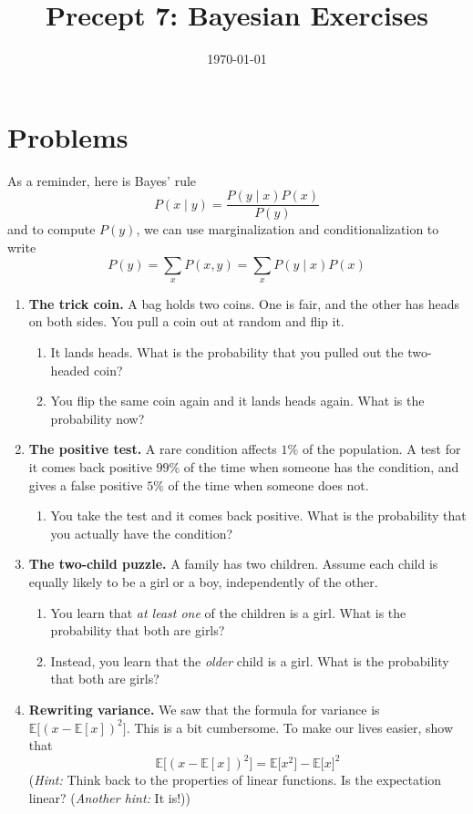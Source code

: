 \documentclass[11pt]{article}
\title{Precept 7: Bayesian Exercises}
\date{\today}
\newcommand{\E}{\mathbb{E}}
\begin{document}
\maketitle
\thispagestyle{fancy}

\section*{Problems}
As a reminder, here is Bayes' rule
\[
P(x\mid y) = \frac{P(y\mid x)P(x)}{P(y)}
\]
and to compute $P(y)$, we can use marginalization and conditionalization to write
\[
P(y) = \sum_x P(x,y) = \sum_x P(y\mid x) P(x)
\]

\begin{enumerate}
    \item \textbf{The trick coin.} A bag holds two coins. One is fair, and the other has heads on both sides. You pull a coin out at random and flip it.
    \begin{enumerate}
        \item It lands heads. What is the probability that you pulled out the two-headed coin?
        \item You flip the same coin again and it lands heads again. What is the probability now?
    \end{enumerate}

    \item \textbf{The positive test.} A rare condition affects $1\%$ of the population. A test for it comes back positive $99\%$ of the time when someone has the condition, and gives a false positive $5\%$ of the time when someone does not.
    \begin{enumerate}
        \item You take the test and it comes back positive. What is the probability that you actually have the condition?
    \end{enumerate}

    \item \textbf{The two-child puzzle.} A family has two children. Assume each child is equally likely to be a girl or a boy, independently of the other.
    \begin{enumerate}
        \item You learn that \emph{at least one} of the children is a girl. What is the probability that both are girls?
        \item Instead, you learn that the \emph{older} child is a girl. What is the probability that both are girls?
    \end{enumerate}

    \item \textbf{Rewriting variance.} We saw that the formula for variance is $\E\big[(x-\E[x])^2\big]$. This is a bit cumbersome. To make our lives easier, show that \[ \E\big[(x-\E[x])^2\big]=\E\big[x^2 \big] - \E\big[x\big]^2 \] (\textit{Hint:} Think back to the properties of linear functions. Is the expectation linear? (\textit{Another hint:} It is!))
\end{enumerate}
\end{document}
